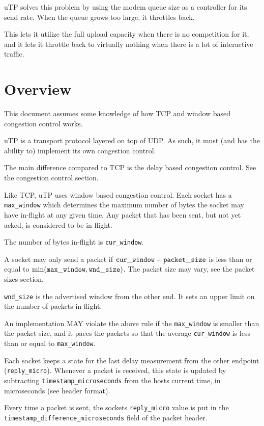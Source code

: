 \documentclass[11pt,a4paper,oneside,draft]{article}
\begin{document}
uTP solves this problem by using the modem queue size as a controller for its send rate. When the queue grows too large, it throttles back.

This lets it utilize the full upload capacity when there is no competition for it, and it lets it throttle back to virtually nothing when there is a lot of interactive traffic.

{\section {Overview}}

This document assumes some knowledge of how TCP and window based congestion control works.

uTP is a transport protocol layered on top of UDP. As such, it must (and has the ability to) implement its own congestion control.

The main difference compared to TCP is the delay based congestion control. See the congestion control section.

Like TCP, uTP uses window based congestion control. Each socket has a {\tt max\_window} which determines the maximum number of bytes the socket may have in-flight at any given time. Any packet that has been sent, but not yet acked, is considered to be in-flight.

The number of bytes in-flight is {\tt cur\_window}.

A socket may only send a packet if ${\tt cur\_window} + {\tt packet\_size}$ is less than or equal to $\min({\tt max\_window}, {\tt wnd\_size})$. The packet size may vary, see the packet sizes section.

{\tt wnd\_size} is the advertised window from the other end. It sets an upper limit on the number of packets in-flight.

An implementation MAY violate the above rule if the {\tt max\_window} is smaller than the packet size, and it paces the packets so that the average {\tt cur\_window} is less than or equal to {\tt max\_window}.

Each socket keeps a state for the last delay measurement from the other endpoint ({\tt reply\_micro}). Whenever a packet is received, this state is updated by subtracting {\tt timestamp\_microseconds} from the hosts current time, in microseconds (see header format).

Every time a packet is sent, the sockets {\tt reply\_micro} value is put in the {\tt timestamp\_difference\_microseconds} field of the packet header.
\end{document}

